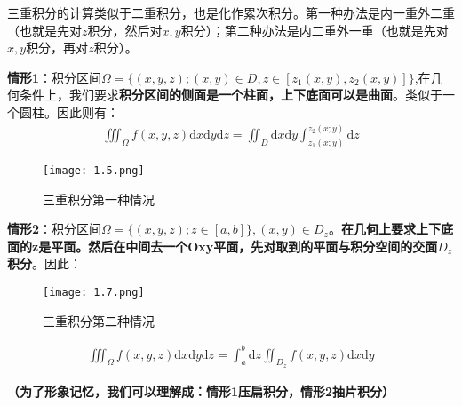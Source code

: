 \documentclass{ctexart}
\let\oldtextbf\textbf
\renewcommand{\textbf}[1]{\textcolor{brown!50!red}{\oldtextbf{#1}}}
\begin{document}
三重积分的计算类似于二重积分，也是化作累次积分。第一种办法是内一重外二重（也就是先对$z$积分，然后对$x,y$积分）；第二种办法是内二重外一重（也就是先对$x,y$积分，再对$z$积分）。
\begin{tcolorbox}[
    colback=bac2,     %
    colframe=fra2,   %
    coltitle=white,             %
    coltext=tex2,
    title=三重积分的计算,
    fonttitle=\bfseries,        %
arc=3mm,                     %
breakable
]
\textbf{\color{brown!50!red}情形1}：积分区间$\Omega=\{(x,y,z);(x,y)\in D,z\in[z_1(x,y),z_2(x,y)]\}$,在几何条件上，我们要求\textbf{\color{brown!50!red}积分区间的侧面是一个柱面，上下底面可以是曲面}。类似于一个圆柱。因此则有：
\begin{align*}
\iiint_\Omega f(x,y,z)\mathrm{d}x\mathrm{d}y\mathrm{d}z=\iint_D\mathrm{d}x\mathrm{d}y
\int_{z_1(x;y)}^{z_2(x;y)}\mathrm{d}z\tag{1-11}  
\end{align*}

\begin{figure}[H]    
\centering     
\renewcommand{\figurename}{图}     
\renewcommand{\thefigure}{1.5}    
\begin{myimagebox}[width=0.44\textwidth] %
\texttt{[image: 1.5.png]} %
\end{myimagebox}     
\caption{\label{fig:1.5}三重积分第一种情况}   
\end{figure}

\textbf{\color{brown!50!red}情形2}：积分区间$\Omega=\{(x,y,z);z\in[a,b]\},(x,y)\in D_z$。\textbf{\color{brown!50!red}在几何上要求上下底面的z是平面。然后在中间去一个Oxy平面，先对取到的平面与积分空间的交面$D_z$积分}。因此：
\begin{figure}[H]    
\centering     
\renewcommand{\figurename}{图}     
\renewcommand{\thefigure}{1.7}    
\begin{myimagebox}[width=0.45\textwidth] %
\texttt{[image: 1.7.png]} %
\end{myimagebox}     
\caption{\label{fig:1.7}三重积分第二种情况}   
\end{figure}
\begin{align*}
    \iiint_\Omega f(x,y,z)\mathrm{d}x\mathrm{d}y\mathrm{d}z=\int_a^b\mathrm{d}z\iint_{D_z}f(x,y,z)\mathrm{d}x\mathrm{d}y\tag{1-12}
\end{align*}

\textbf{（为了形象记忆，我们可以理解成：情形1压扁积分，情形2抽片积分）}
\end{tcolorbox}
\end{document}

